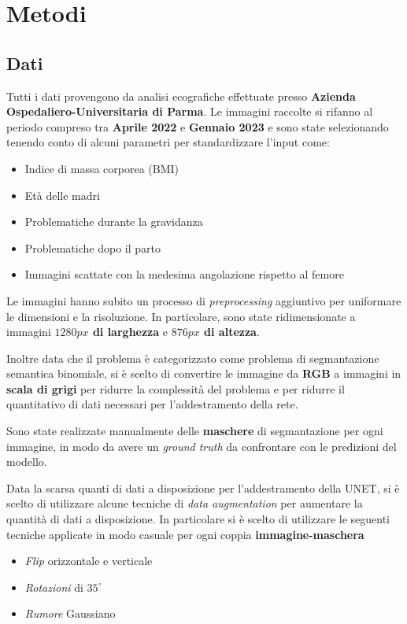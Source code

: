\chapter{Metodi} %
\label{chap:Metodi}

\section{Dati}

Tutti i dati provengono da analisi ecografiche effettuate presso \textbf{Azienda Ospedaliero-Universitaria di Parma}.
Le immagini raccolte si rifanno al periodo compreso tra \textbf{Aprile 2022} e \textbf{Gennaio 2023} e sono state selezionando tenendo conto di alcuni parametri per standardizzare l'input come:
\begin{itemize}
  \item Indice di massa corporea (BMI)
  \item Età delle madri
  \item Problematiche durante la gravidanza
  \item Problematiche dopo il parto
  \item Immagini scattate con la medesima angolazione rispetto al femore
\end{itemize}


Le immagini hanno subito un processo di \textit{preprocessing} aggiuntivo per uniformare le dimensioni e la risoluzione. In particolare, sono state ridimensionate a immagini \textbf{$1280px$ di larghezza} e \textbf{$876px$ di altezza}.


Inoltre data che il problema è categorizzato come problema di segmantazione semantica binomiale, si è scelto di convertire le immagine da \textbf{RGB} a immagini in \textbf{scala di grigi} per ridurre la complessità del problema e per ridurre il quantitativo di dati necessari per l'addestramento della rete.


Sono state realizzate manualmente delle \textbf{maschere} di segmantazione per ogni immagine, in modo da avere un \textit{ground truth} da confrontare con le predizioni del modello.


Data la scarsa quanti di dati a disposizione per l'addestramento della UNET, si è scelto di utilizzare alcune tecniche di \textit{data augmentation} per aumentare la quantità di dati a disposizione. In particolare si è scelto di utilizzare le seguenti tecniche applicate in modo casuale per ogni coppia \textbf{immagine-maschera}
\begin{itemize}
	\item \textit{Flip} orizzontale e verticale
	\item \textit{Rotazioni} di $35^{\circ}$
	\item \textit{Rumore} Gaussiano
\end{itemize}

